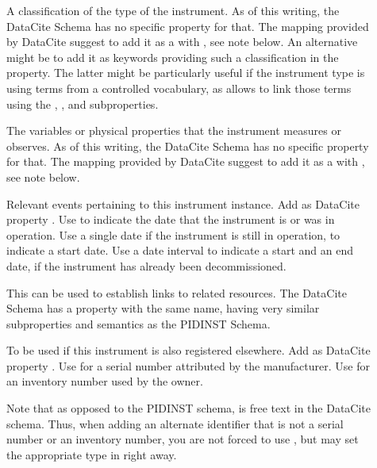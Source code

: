 \documentclass[a4paper,10pt,english]{sphinxmanual}
\begin{document}
\begin{description}
\item[{}] \leavevmode
\sphinxAtStartPar
A classification of the type of the instrument.  As of this writing,
the DataCite Schema has no specific property for that.  The mapping
provided by DataCite suggest to add it as a  with
, see note below.  An alternative
might be to add it as keywords providing such a classification in
the  property.  The latter might be particularly useful if
the instrument type is using terms from a controlled vocabulary, as
 allows to link those terms using the ,
, and  subproperties.

\item[{}] \leavevmode
\sphinxAtStartPar
The variables or physical properties that the instrument measures or
observes.  As of this writing, the DataCite Schema has no specific
property for that.  The mapping provided by DataCite suggest to add
it as a  with , see note
below.

\item[{}] \leavevmode
\sphinxAtStartPar
Relevant events pertaining to this instrument instance.  Add as
DataCite property .  Use  to indicate the
date that the instrument is or was in operation.  Use a single date
if the instrument is still in operation, to indicate a start date.
Use a date interval to indicate a start and an end date, if the
instrument has already been decommissioned.

\item[{}] \leavevmode
\sphinxAtStartPar
This can be used to establish links to related resources.  The
DataCite Schema has a property with the same name, having very
similar subproperties and semantics as the PIDINST Schema.

\item[{}] \leavevmode
\sphinxAtStartPar
To be used if this instrument is also registered elsewhere.  Add as
DataCite property .  Use
 for a serial number
attributed by the manufacturer.  Use
 for an inventory number
used by the owner.

\sphinxAtStartPar
Note that as opposed to the PIDINST schema,
 is free text in the DataCite schema.
Thus, when adding an alternate identifier that is not a serial
number or an inventory number, you are not forced to use
, but may set the appropriate type in
 right away.

\end{description}
\end{document}
